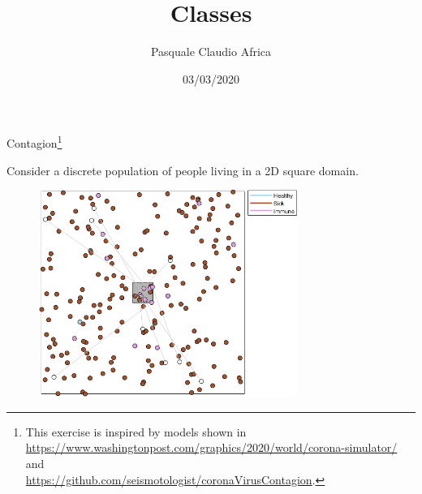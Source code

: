 \documentclass[10pt]{beamer}
\begin{document}
    \title{Classes}
    \author{Pasquale Claudio Africa}
    \date{03/03/2020}
    
\begin{frame}
    \maketitle
\end{frame}

\begin{frame}{Contagion\footnote{This exercise is inspired by models shown in \\
\url{https://www.washingtonpost.com/graphics/2020/world/corona-simulator/} and \\
\url{https://github.com/seismotologist/coronaVirusContagion}.}}

Consider a discrete population of people living in a 2D square domain.

\begin{figure}
    \includegraphics[width=0.75\textwidth]{contagion.png}
\end{figure}
\end{frame}
\end{document}
